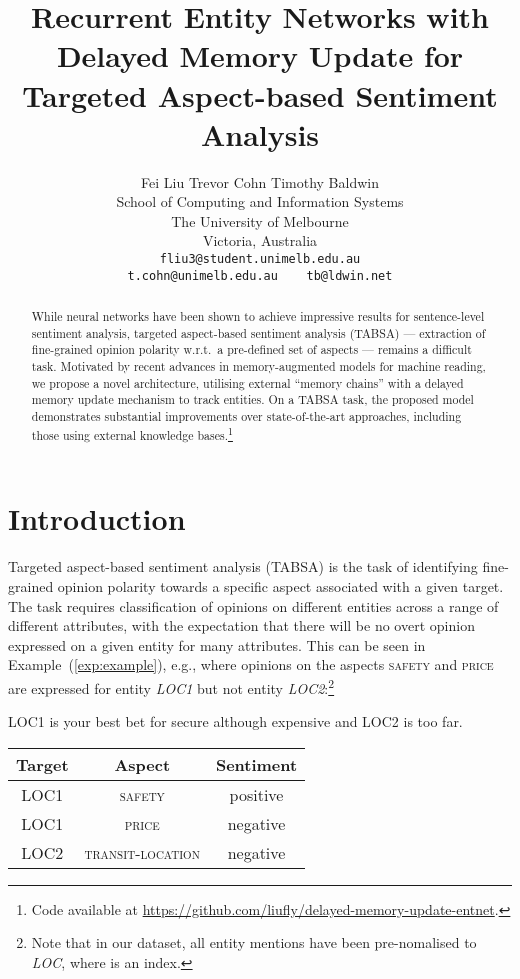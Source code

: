 \documentclass[11pt,a4paper]{article}
\title{Recurrent Entity Networks with Delayed Memory Update for\\ Targeted Aspect-based Sentiment Analysis}
\author{Fei Liu \qquad Trevor Cohn \qquad Timothy Baldwin \\
         School of Computing and Information Systems \\ The University of Melbourne \\ Victoria, Australia\\
         {\tt {fliu3@student.unimelb.edu.au}} \\
         {\tt {t.cohn@unimelb.edu.au}\,\,\, {tb@ldwin.net}}}
\date{}
\newcommand{\lex}[1]{\textit{#1}\xspace}
\newcommand{\aspect}[1]{\textsc{#1}\xspace}
\newcommand{\exref}[2][]{Example#1~(\ref{#2})\xspace}
\begin{document}
\maketitle
\begin{abstract}

While neural networks have been shown to achieve impressive results for sentence-level sentiment analysis, targeted aspect-based sentiment analysis (TABSA) --- extraction of fine-grained opinion polarity w.r.t.\ a pre-defined set of aspects --- remains a difficult task. Motivated by recent advances in memory-augmented models for machine reading, we propose a novel architecture, utilising external ``memory chains'' with a delayed memory update mechanism to track entities. On a TABSA task, the proposed model demonstrates substantial improvements over state-of-the-art approaches, including those using external knowledge bases.\footnote{Code available at \url{https://github.com/liufly/delayed-memory-update-entnet}.}

\end{abstract}

\section{Introduction}

Targeted aspect-based sentiment analysis (TABSA) is the task of identifying fine-grained opinion polarity towards a specific aspect associated with a given target. The task requires classification of opinions on different entities across a range of different attributes, with the expectation that there will be no overt opinion expressed on a given entity for many attributes. This can be seen in \exref{exp:example}, e.g., where opinions on the aspects \aspect{safety} and \aspect{price} are expressed for entity \lex{LOC1} but not entity \lex{LOC2}:\footnote{Note that in our dataset, all entity mentions have been pre-nomalised to \lex{LOC}, where  is an index.}
   
\begin{example}
LOC1 is your best bet for secure although expensive and LOC2 is too far.\\
\label{exp:example}
\end{example}

\begin{center}
\small
\begin{tabular}{ccc}
\toprule
Target & Aspect & Sentiment\\
\midrule
LOC1 & \aspect{safety} & positive\\
LOC1 & \aspect{price} & negative \\
LOC2 & \aspect{transit-location} & negative\\ 
\bottomrule
\end{tabular}
\end{center}
\vspace{0.3cm}
\end{document}
